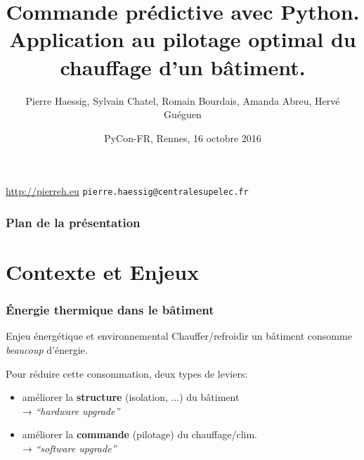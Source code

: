 

\title{Commande prédictive avec Python.\\
Application au pilotage optimal du chauffage d’un bâtiment.}

\author{Pierre Haessig, Sylvain Chatel, Romain Bourdais, Amanda Abreu, Hervé Guéguen}

\date{PyCon-FR, Rennes, 16 octobre 2016}



  \begin{frame}

  \titlepage

  \color{gray} \small
   \url{http://pierreh.eu}
   \hfill
   \texttt{pierre.haessig@centralesupelec.fr}

  \end{frame}

 \begin{frame}
   \frametitle{Plan de la présentation}

   \tableofcontents

 \end{frame}

\section{Contexte et Enjeux}

\begin{frame}[c]
  \frametitle{Énergie thermique dans le bâtiment}

  \begin{block}{Enjeu énergétique et environnemental}
    Chauffer/refroidir un bâtiment consomme \emph{beaucoup} d'énergie. %
  \end{block}

  \bigskip

  Pour réduire cette consommation, deux types de leviers:

  \begin{itemize}
    \item améliorer la \textbf{structure} (isolation, ...) du bâtiment\\
    → \emph{``hardware upgrade''}
    \pause
    \item améliorer la \textbf{commande} (pilotage) du chauffage/clim.\\
    → \emph{``software upgrade''}
  \end{itemize}

\end{frame}

